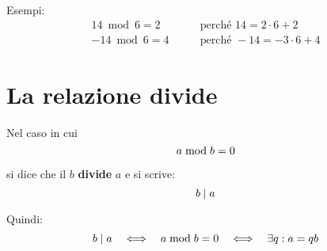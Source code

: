 Esempi:
\begin{align*}
    14 \bmod 6 = 2 &\quad\quad\text{perché } 14 = 2\cdot 6 + 2 \\
    -14 \bmod 6 = 4 &\quad\quad\text{perché } -14 = -3 \cdot 6 + 4
\end{align*}

\section{La relazione divide}
\label{sec:divide}

\begin{definizione}[Divide]
    Nel caso in cui
    \begin{equation*}
        a  \bmod  b = 0
    \end{equation*}
    
    si dice che il $b$ \textbf{divide} $a$ e si scrive:
    \begin{equation*}
        b  \mid  a
    \end{equation*}

    Quindi:
    \begin{equation*}
        b  \mid  a  \quad\Longleftrightarrow\quad  a  \bmod  b = 0  \quad\Longleftrightarrow\quad  \exists q : a = qb
    \end{equation*}
    
\end{definizione}

